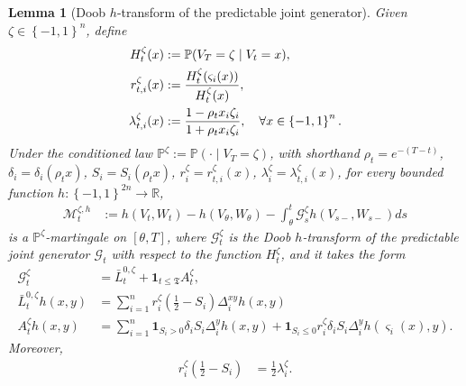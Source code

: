 \documentclass[10pt,a4paper]{amsart}
\newtheorem{lemma}{Lemma}
\newcommand{\Prob}{\ensuremath{{\mathbb{P}}}}
\newcommand{\braces}[1]{\left\{ #1 \right \}}
\newcommand{\cG}{\mathcal{G}}
\newcommand{\cM}{\mathcal{M}}
\newcommand{\defn}{:=}
\newcommand{\flip}{\varsigma}
\newcommand{\jL}{\bar{L}}
\newcommand{\parenth}[1]{\left( #1 \right)}
\newcommand{\real}{\ensuremath{\mathbb{R}}}
\newcommand{\stopT}{{\boldsymbol{\mathfrak{T}}}}
\newcommand{\uV}{V}
\newcommand{\uW}{W}
\begin{document}
\begin{lemma}[Doob $h$-transform of the predictable joint generator]
  \label{lem:Doob_h_transform}
  Given $\zeta \in \braces{-1,1}^n$, define
  \begin{align}
    \label{eq:def_H_r_lambda}
    H_t^\zeta(x) &\defn \Prob(\uV_T = \zeta \mid \uV_t = x), \notag \\
    r_{t, i}^{\zeta}(x) &\defn \frac{H_t^\zeta(\flip_i(x))}{H_t^\zeta(x)}, \notag \\
    \lambda_{t, i}^{\zeta}(x) &\defn \frac{1 - \rho_t x_i \zeta_i}{1 + \rho_t x_i \zeta_i}, \quad \forall x \in \braces{-1, 1}^n.
  \end{align}
  Under the conditioned law $\Prob^\zeta \defn \Prob(\cdot \mid \uV_T = \zeta)$,  with shorthand $\rho_t = e^{-(T-t)}$, $\delta_i = \delta_i(\rho_t x)$, $S_i = S_i(\rho_t x)$, $r_i^{\zeta} = r_{t, i}^{\zeta}(x)$, $\lambda_i^{\zeta} = \lambda_{t, i}^{\zeta}(x)$, for every bounded function $h: \braces{-1, 1}^{2n} \to \real$, 
  \begin{align*}
    \cM_t^{\zeta, h} &\defn h(\uV_t, \uW_t) - h(\uV_\theta, \uW_\theta) - \int_\theta^t \cG_s^\zeta h(\uV_{s-}, \uW_{s-}) ds
  \end{align*}
  is a $\Prob^\zeta$-martingale on $[\theta, T]$, where $\cG_t^\zeta$ is the Doob $h$-transform of the predictable joint generator $\cG_t$ with respect to the function $H_t^\zeta$, and it takes the form
  \begin{align*}
    \cG_t^\zeta &= \jL_t^{0, \zeta} + \mathbf{1}_{t \leq \stopT} A_t^\zeta, \\
    \jL_t^{0, \zeta} h(x, y) &= \sum_{i=1}^n r_{i}^{\zeta} \parenth{\frac12 - S_i } \Delta_i^{xy} h(x, y) \\
    A_t^\zeta h(x, y) &= \sum_{i=1}^n  \mathbf{1}_{S_i > 0}  \delta_i  S_i \Delta_{i}^y h(x, y)  + \mathbf{1}_{S_i \leq 0} r_{i}^{\zeta} \delta_i  S_i  \Delta_i^y h(\flip_i(x), y).
  \end{align*}
  Moreover,
  \begin{align*}
    r_i^{\zeta} \parenth{\frac12 - S_i } &=  \frac12 \lambda_{i}^\zeta.
  \end{align*}
\end{lemma}
\end{document}
